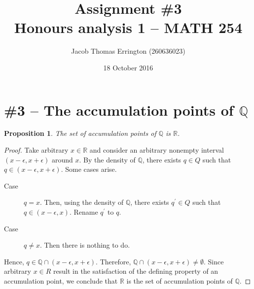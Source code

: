 \documentclass[letterpaper,11pt]{article}
\author{Jacob Thomas Errington (260636023)}
\title{Assignment \#3\\Honours analysis 1 -- MATH 254}
\date{18 October 2016}
\newtheorem{prop}{Proposition}
\newcommand{\R}{\mathbb{R}}
\newcommand{\Q}{\mathbb{Q}}
\begin{document}
\maketitle

\section*{\#3 -- The accumulation points of $\Q$}

\begin{prop}
    The set of accumulation points of $\Q$ is $\R$.
\end{prop}

\begin{proof}
    Take arbitrary $x \in \R$ and consider an arbitrary nonempty interval
    $(x - \epsilon, x + \epsilon)$ around $x$. By the density of $\Q$, there
    exists $q \in Q$ such that $q \in (x - \epsilon, x + \epsilon)$.
    Some cases arise.
    \begin{description}
        \item[Case] $q = x$. Then, using the density of $\Q$, there exists
            $q^\prime \in Q$ such that $q \in (x - \epsilon, x)$. Rename
            $q^\prime$ to $q$.
        \item[Case] $q \neq x$. Then there is nothing to do.
    \end{description}
    Hence, $q \in \Q \cap (x - \epsilon, x + \epsilon)$. Therefore,
    $\Q \cap (x - \epsilon, x + \epsilon) \neq \emptyset$. Since arbitrary
    $x \in R$ result in the satisfaction of the defining property of an
    accumulation point, we conclude that $\R$ is the set of accumulation points
    of $\Q$.
\end{proof}
\end{document}

